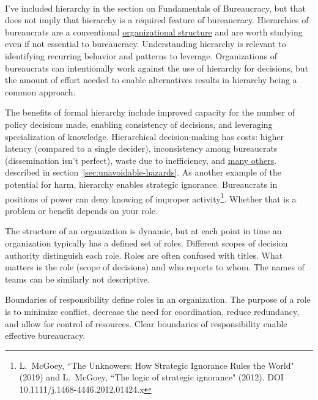 \ \\

I've included hierarchy in the section on Fundamentals of Bureaucracy, but that does not imply that hierarchy is a required feature of bureaucracy. Hierarchies of bureaucrats are a conventional \href{https://en.wikipedia.org/wiki/Organizational_structure}{organizational structure} 
and are worth studying even if not essential to bureaucracy. Understanding hierarchy is relevant to identifying recurring behavior and patterns to leverage.
Organizations of bureaucrats can intentionally work against the use of hierarchy for decisions, but the amount of effort needed to enable alternatives results in hierarchy being a common approach.

The benefits of formal hierarchy include improved capacity for the number of policy decisions made, enabling consistency of decisions, and leveraging specialization of knowledge. 
Hierarchical decision-making has costs: higher latency (compared to a single decider), inconsistency among bureaucrats (dissemination isn't perfect), waste due to inefficiency, and 
\hyperref[sec:unavoidable-hazards]{many others}.
\ifsectionref
described in section~\ref{sec:unavoidable-hazards}. 
\fi
As another example of the potential for harm, hierarchy enables strategic ignorance. Bureaucrats in positions of power can deny knowing of improper activity\footnote{L.~McGoey, ``The Unknowers: How Strategic Ignorance Rules the World" (2019)
and 
L.~McGoey, ``The logic of strategic ignorance" (2012). DOI 
10.1111/j.1468-4446.2012.01424.x
}. Whether that is a problem or benefit depends on your role. 



The structure of an organization is dynamic, but at each point in time an organization typically has a defined set of roles. Different scopes of decision authority distinguish each role. 
Roles are often confused with titles. What matters is the role (scope of decisions) and who reports to whom. The names of teams can be similarly not descriptive.




Boundaries of responsibility define roles in an organization. The purpose of a role is to minimize conflict, decrease the need for coordination, reduce redundancy, and allow for control of resources. Clear boundaries of responsibility  enable effective bureaucracy. 


